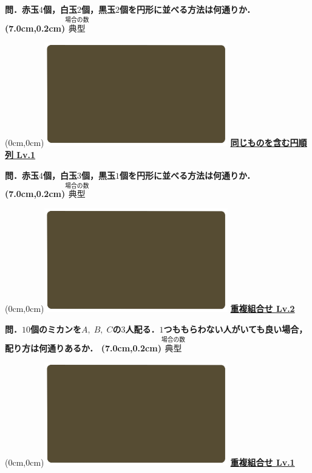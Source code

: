 \documentclass[10pt,
fleqn,
dvipdfmx,
uplatex
]{jsarticle}
\begin{document}
\huge 
\bf\boldmath 問．赤玉$4$個，白玉$2$個，黒玉$2$個を円形に並べる方法は何通りか．
\at(7.0cm,0.2cm){\small\color{bradorange}$\overset{\text{場合の数}}{\text{典型}}$}


\newpage



\at(0cm,0cm){\includegraphics[width=8cm,bb=0 0 1920 1080]{./youtube/thumbnails/templates/smart_background/場合の数.jpeg}}
{\color{orange}\bf\boldmath\Large\underline{同じものを含む円順列 Lv.1 }}\vspace{0.3zw}

\huge 
\bf\boldmath 問．赤玉$4$個，白玉$3$個，黒玉$1$個を円形に並べる方法は何通りか．
\at(7.0cm,0.2cm){\small\color{bradorange}$\overset{\text{場合の数}}{\text{典型}}$}


\newpage



\at(0cm,0cm){\includegraphics[width=8cm,bb=0 0 1920 1080]{./youtube/thumbnails/templates/smart_background/場合の数.jpeg}}
{\color{orange}\bf\boldmath\huge\underline{重複組合せ Lv.2 }}\vspace{0.3zw}

\LARGE 
\bf\boldmath 問．${10}$個のミカンを$A,\;B,\;C$の$3$人配る．$1$つももらわない人がいても良い場合，配り方は何通りあるか．
\at(7.0cm,0.2cm){\small\color{bradorange}$\overset{\text{場合の数}}{\text{典型}}$}


\newpage



\at(0cm,0cm){\includegraphics[width=8cm,bb=0 0 1920 1080]{./youtube/thumbnails/templates/smart_background/場合の数.jpeg}}
{\color{orange}\bf\boldmath\huge\underline{重複組合せ Lv.1 }}\vspace{0.3zw}
\end{document}
